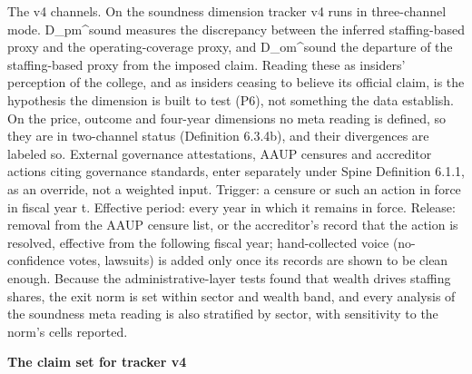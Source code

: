 \documentclass[
]{article}
\begin{document}
The v4 channels. On the soundness dimension tracker v4 runs in
three-channel mode. D\_pm\^{}sound measures the discrepancy between the
inferred staffing-based proxy and the operating-coverage proxy, and
D\_om\^{}sound the departure of the staffing-based proxy from the
imposed claim. Reading these as insiders' perception of the college, and
as insiders ceasing to believe its official claim, is the hypothesis the
dimension is built to test (P6), not something the data establish. On
the price, outcome and four-year dimensions no meta reading is defined,
so they are in two-channel status (Definition 6.3.4b), and their
divergences are labeled so. External governance attestations, AAUP
censures and accreditor actions citing governance standards, enter
separately under Spine Definition 6.1.1, as an override, not a weighted
input. Trigger: a censure or such an action in force in fiscal year t.
Effective period: every year in which it remains in force. Release:
removal from the AAUP censure list, or the accreditor's record that the
action is resolved, effective from the following fiscal year;
hand-collected voice (no-confidence votes, lawsuits) is added only once
its records are shown to be clean enough. Because the
administrative-layer tests found that wealth drives staffing shares, the
exit norm is set within sector and wealth band, and every analysis of
the soundness meta reading is also stratified by sector, with
sensitivity to the norm's cells reported.

\textbf{The claim set for tracker v4}
\end{document}
